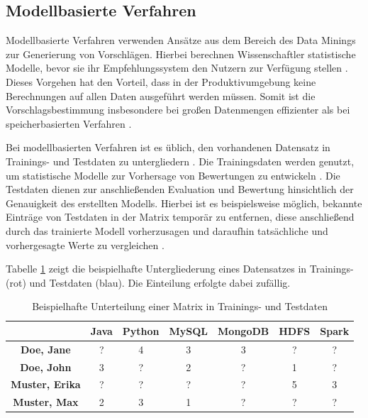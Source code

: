 \subsection{Modellbasierte Verfahren}
\label{ch:empfehlungssysteme:cf:modellbasiert}
Modellbasierte Verfahren verwenden Ansätze aus dem Bereich des Data Minings zur Generierung von Vorschlägen. Hierbei berechnen Wissenschaftler statistische Modelle, bevor sie ihr Empfehlungssystem den Nutzern zur Verfügung stellen \cite[S. 2]{cui:2020}. Dieses Vorgehen hat den Vorteil, dass in der Produktivumgebung keine Berechnungen auf allen Daten ausgeführt werden müssen. Somit ist die Vorschlagsbestimmung insbesondere bei großen Datenmengen effizienter als bei speicherbasierten Verfahren \cite[S. 8]{yang:2016}.

Bei modellbasierten Verfahren ist es üblich, den vorhandenen Datensatz in Trainings- und Testdaten zu untergliedern \cite[S. 71f.]{recommenderSystems:2016}. Die Trainingsdaten werden genutzt, um statistische Modelle zur Vorhersage von Bewertungen zu entwickeln \cite[S. 71f.]{recommenderSystems:2016}. Die Testdaten dienen zur anschließenden Evaluation und Bewertung hinsichtlich der Genauigkeit des erstellten Modells. Hierbei ist es beispielsweise möglich, bekannte Einträge von Testdaten in der Matrix temporär zu entfernen, diese anschließend durch das trainierte Modell vorherzusagen und daraufhin tatsächliche und vorhergesagte Werte zu vergleichen \cite[S. 3ff.]{kang:2016}.

Tabelle \ref{tbl:empfehlungssysteme:cf:modellbasiert:tbl1} zeigt die beispielhafte Untergliederung eines Datensatzes in Trainings- (rot) und Testdaten (blau). Die Einteilung erfolgte dabei zufällig.

\begin{table}[h]
	\centering
	\begin{tabular}{c|c|c|c|c|c|c}
		& \textbf{Java} & \textbf{Python} & \textbf{MySQL} & \textbf{MongoDB} & \textbf{HDFS} & \textbf{Spark}\\ 
		\hline
		\textbf{Doe, Jane} & ? & \cellcolor{itemcolor}4 & \cellcolor{itemcolor}3 & \cellcolor{usercolor}3 & ? & ?\\
		\textbf{Doe, John} & \cellcolor{itemcolor}3 & ? & \cellcolor{usercolor}2 & ? & \cellcolor{usercolor}1 & ?\\
		\textbf{Muster, Erika} & ? & ? & ? & ? & \cellcolor{itemcolor}5 & \cellcolor{usercolor}3\\
		\textbf{Muster, Max} & \cellcolor{itemcolor}2 & \cellcolor{usercolor}3 & \cellcolor{itemcolor}1 & ? & ? & ?\\
	\end{tabular}
	\caption{Beispielhafte Unterteilung einer Matrix in Trainings- und Testdaten}
	\label{tbl:empfehlungssysteme:cf:modellbasiert:tbl1}
\end{table}

